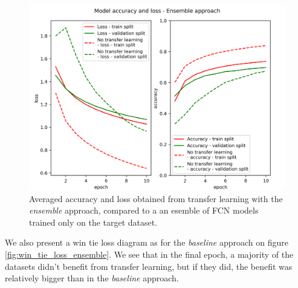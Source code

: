 \documentclass[a4paper,11pt,twoside]{report}
\theoremstyle{definition}
\begin{document}
\begin{figure}[h!t]
\centering
\includegraphics[width=17 cm]{imgs/ensemble/loss_acc.png}
\caption{Averaged accuracy and loss obtained from transfer learning with the \textit{ensemble} approach, compared to a an esemble of FCN models trained only on the target dataset.}
\label{fig:ensemble_acc}
\end{figure}
\FloatBarrier
We also present a win tie loss diagram as for the \textit{baseline} approach on figure \ref{fig:win_tie_loss_ensemble}. We see that in the final epoch, a majority of the datasets didn't benefit from transfer learning, but if they did, the benefit was relatively bigger than in the \textit{baseline} approach.
\end{document}
